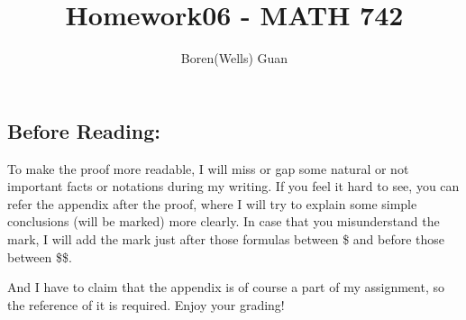\documentclass[lang=en,11pt,a4paper,citestyle =authoryear]{elegantpaper}
\title{Homework06 - MATH 742}
\author{Boren(Wells) Guan}
\begin{document}
\maketitle

\subsection*{Before Reading:}\par
To make the proof more readable, I will miss or gap some natural or not important facts or notations during my writing. If you feel it hard to see, you can refer the appendix after the proof, where I will try to explain some simple conclusions (will be marked) more clearly. In case that you misunderstand the mark, I will add the mark just after those formulas between \$ and before those between \$\$.\par
And I have to claim that the appendix is of course a part of my assignment, so the reference of it is required. Enjoy your grading!
\end{document}
